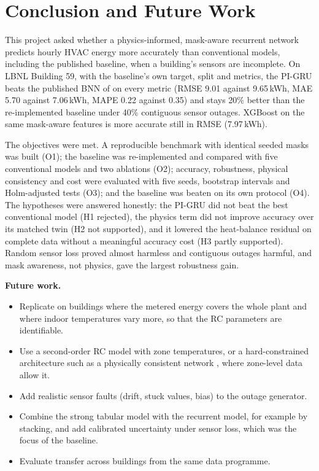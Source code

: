 \section{Conclusion and Future Work}\label{sec:concl}

This project asked whether a physics-informed, mask-aware recurrent network predicts hourly HVAC energy more accurately than conventional models, including the published baseline, when a building's sensors are incomplete. On LBNL Building 59, with the baseline's own target, split and metrics, the PI-GRU beats the published BNN of \citet{mahajan2024bnn} on every metric (RMSE 9.01 against 9.65\,kWh, MAE 5.70 against 7.06\,kWh, MAPE 0.22 against 0.35) and stays 20\% better than the re-implemented baseline under 40\% contiguous sensor outages. XGBoost on the same mask-aware features is more accurate still in RMSE (7.97\,kWh).

The objectives were met. A reproducible benchmark with identical seeded masks was built (O1); the baseline was re-implemented and compared with five conventional models and two ablations (O2); accuracy, robustness, physical consistency and cost were evaluated with five seeds, bootstrap intervals and Holm-adjusted tests (O3); and the baseline was beaten on its own protocol (O4). The hypotheses were answered honestly: the PI-GRU did not beat the best conventional model (H1 rejected), the physics term did not improve accuracy over its matched twin (H2 not supported), and it lowered the heat-balance residual on complete data without a meaningful accuracy cost (H3 partly supported). Random sensor loss proved almost harmless and contiguous outages harmful, and mask awareness, not physics, gave the largest robustness gain.

\textbf{Future work.}
\begin{itemize}[nosep]
\item Replicate on buildings where the metered energy covers the whole plant and where indoor temperatures vary more, so that the RC parameters are identifiable.
\item Use a second-order RC model with zone temperatures, or a hard-constrained architecture such as a physically consistent network \citep{dinatale2022pcnn}, where zone-level data allow it.
\item Add realistic sensor faults (drift, stuck values, bias) to the outage generator.
\item Combine the strong tabular model with the recurrent model, for example by stacking, and add calibrated uncertainty under sensor loss, which was the focus of the baseline.
\item Evaluate transfer across buildings from the same data programme.
\end{itemize}
